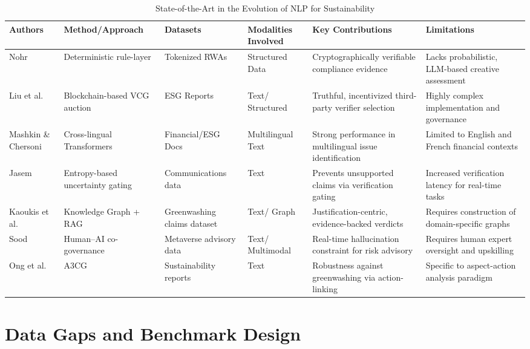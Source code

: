 \documentclass[english, online, cse, master]{dithesis}
\begin{document}
\begin{landscape}
\begin{table}[p]
\centering
\caption{State-of-the-Art in the Evolution of NLP for Sustainability}
\label{tab:evolution-of-nlp-for-sustainability}
\small
\renewcommand{\arraystretch}{1.2}
\begin{tabularx}{\linewidth}{|p{1.8cm}|X|X|p{1.8cm}|X|X|}
\hline
Authors & Method/Approach & Datasets & Modalities Involved & Key Contributions & Limitations \\ \hline
Nohr  \parencite{steven_paul_nohr_a6874924} & Deterministic rule-layer & Tokenized RWAs & Structured Data & Cryptographically verifiable compliance evidence & Lacks probabilistic, LLM-based creative assessment \\ \hline
Liu et al.  \parencite{liyuan_liu_91c36432} & Blockchain-based VCG auction & ESG Reports & Text/ Structured & Truthful, incentivized third-party verifier selection & Highly complex implementation and governance \\ \hline
Mashkin \& Chersoni  \parencite{ivan_mashkin_fba24085} & Cross-lingual Transformers & Financial/ESG Docs & Multilingual Text & Strong performance in multilingual issue identification & Limited to English and French financial contexts \\ \hline
Jasem  \parencite{al_noor_ali_aziz_jasem_af362154} & Entropy-based uncertainty gating & Communications data & Text & Prevents unsupported claims via verification gating & Increased verification latency for real-time tasks \\ \hline
Kaoukis et al.  \parencite{kaoukis__georgios_35bab107} & Knowledge Graph + RAG & Greenwashing claims dataset & Text/ Graph & Justification-centric, evidence-backed verdicts & Requires construction of domain-specific graphs \\ \hline
Sood  \parencite{rohit_sood_cb3a4ead} & Human–AI co-governance & Metaverse advisory data & Text/ Multimodal & Real-time hallucination constraint for risk advisory & Requires human expert oversight and upskilling \\ \hline
Ong et al.  \parencite{keane_ong_0a5de439} & A3CG & Sustainability reports & Text & Robustness against greenwashing via action-linking & Specific to aspect-action analysis paradigm \\ \hline
\end{tabularx}
\end{table}
\end{landscape}


\section{Data Gaps and Benchmark Design}
\end{document}
